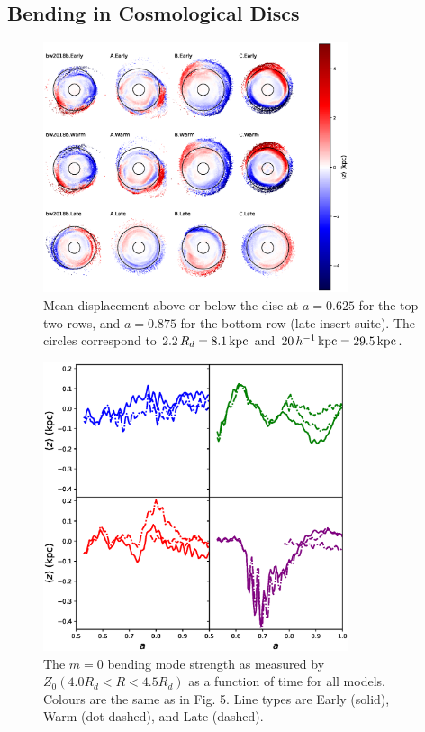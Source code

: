 \subsection{Bending in Cosmological Discs}
\begin{figure}
    \centering
	\includegraphics[width=0.8\textwidth]{../figures/twelve_panel_displacements_025.eps} \caption{Mean displacement above or below the disc at $a=0.625$ for the top two rows, and $a=0.875$ for the bottom row (late-insert suite). The circles correspond to $2.2 \,R_d = 8.1\,\text{kpc}$ and $20 \, h^{-1} \, \text{kpc} = 29.5\,\text{kpc}$.  }
	\label{fig:vertical_displacement_map}
\end{figure}


\begin{figure}
	\centering
	\includegraphics[width=0.8\textwidth]{../figures/z_0_all_models_four_panel.eps}
	\caption{The $m=0$ bending mode strength as measured by $Z_0(4.0 R_d < R < 4.5 R_d)$ as a function of time for all models. Colours are the same as in Fig. 5. Line types are Early (solid), Warm (dot-dashed), and Late (dashed).} \label{fig:z_0}
\end{figure}

